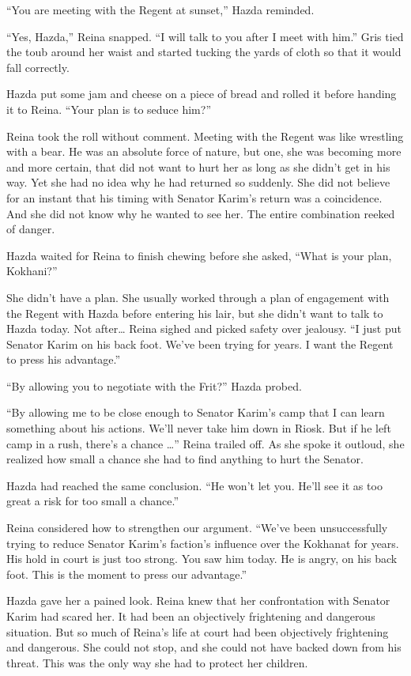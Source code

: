 \documentclass{article}
\begin{document}
	“You are meeting with the Regent at sunset,”  Hazda reminded.
	
	“Yes, Hazda,” Reina snapped. “I will talk to you after I meet with him.” Gris tied the toub around her waist and started tucking the yards of cloth so that it would fall correctly.
	
	Hazda put some jam and cheese on a piece of bread and rolled it before handing it to Reina. “Your plan is to seduce him?”
	
	Reina took the roll without comment. Meeting with the Regent was like wrestling with a bear. He was an absolute force of nature, but one, she was becoming more and more certain, that did not want to hurt her as long as she didn’t get in his way. Yet she had no idea why he had returned so suddenly. She did not believe for an instant that his timing with Senator Karim’s return was a coincidence. And she did not know why he wanted to see her. The entire combination reeked of danger.
	
	Hazda waited for Reina to finish chewing before she asked, “What is your plan, Kokhani?”
	
	She didn’t have a plan. She usually worked through a plan of engagement with the Regent with Hazda before entering his lair, but she didn’t want to talk to Hazda today. Not after… Reina sighed and picked safety over jealousy. “I just put Senator Karim on his back foot. We’ve been trying for years. I want the Regent to press his advantage.”
	
	“By allowing you to negotiate with the Frit?” Hazda probed.
	
	“By allowing me to be close enough to Senator Karim’s camp that I can learn something about his actions. We’ll never take him down in Riosk. But if he left camp in a rush, there’s  a chance …” Reina trailed off. As she spoke it outloud, she realized how small a chance she had to find anything to hurt the Senator.
	
	Hazda had reached the same conclusion. “He won’t let you. He’ll see it as too great a risk for too small a chance.” 
	
	Reina considered how to strengthen our argument. “We’ve been unsuccessfully trying to reduce Senator Karim’s faction’s influence over the Kokhanat for years. His hold in court is just too strong. You saw him today. He is angry, on his back foot. This is the moment to press our advantage.” 
	
	Hazda gave her a pained look. Reina knew that her confrontation with Senator Karim had scared her. It had been an objectively frightening and dangerous situation. But so much of Reina’s life at court had been objectively frightening and dangerous. She could not stop, and she could not have backed down from his threat. This was the only way she had to protect her children.
	
\end{document}
